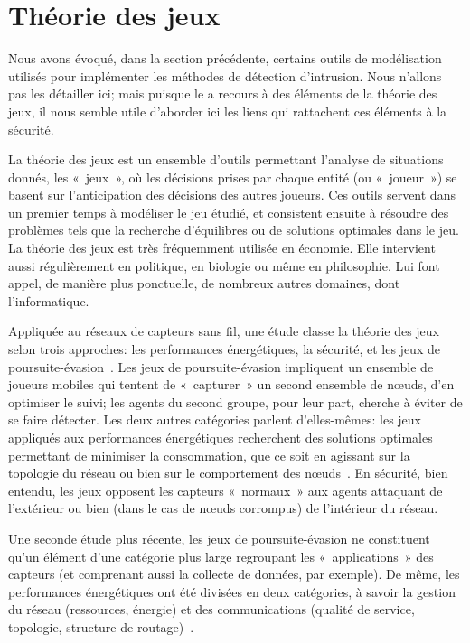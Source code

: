 \section{Théorie des jeux}

Nous avons évoqué, dans la section précédente, certains outils de modélisation utilisés pour implémenter les méthodes de détection d'intrusion.
Nous n'allons pas les détailler ici; mais puisque le  a recours à des éléments de la théorie des jeux, il nous semble utile d'aborder ici les liens qui rattachent ces éléments à la sécurité.

La théorie des jeux est un ensemble d'outils permettant l'analyse de situations donnés, les « jeux », où les décisions prises par chaque entité (ou « joueur ») se basent sur l'anticipation des décisions des autres joueurs.
Ces outils servent dans un premier temps à modéliser le jeu étudié, et consistent ensuite à résoudre des problèmes tels que la recherche d'équilibres ou de solutions optimales dans le jeu.
La théorie des jeux est très fréquemment utilisée en économie.
Elle intervient aussi régulièrement en politique, en biologie ou même en philosophie.
Lui font appel, de manière plus ponctuelle, de nombreux autres domaines, dont l'informatique.

Appliquée au réseaux de capteurs sans fil, une étude classe la théorie des jeux selon trois approches: les performances énergétiques, la sécurité, et les jeux de poursuite-évasion~\cite{MT08}.
Les jeux de poursuite-évasion impliquent un ensemble de joueurs mobiles qui tentent de « capturer » un second ensemble de nœuds, d'en optimiser le suivi; les agents du second groupe, pour leur part, cherche à éviter de se faire détecter.
Les deux autres catégories parlent d'elles-mêmes: les jeux appliqués aux performances énergétiques recherchent des solutions optimales permettant de minimiser la consommation, que ce soit en agissant sur la topologie du réseau ou bien sur le comportement des nœuds~\cite{CPF09}.
En sécurité, bien entendu, les jeux opposent les capteurs « normaux » aux agents attaquant de l'extérieur ou bien (dans le cas de nœuds corrompus) de l'intérieur du réseau.

Une seconde étude plus récente, les jeux de poursuite-évasion ne constituent qu'un élément d'une catégorie plus large regroupant les « applications » des capteurs (et comprenant aussi la collecte de données, par exemple).
De même, les performances énergétiques ont été divisées en deux catégories, à savoir la gestion du réseau (ressources, énergie) et des communications (qualité de service, topologie, structure de routage)~\cite{SWKC12}.

